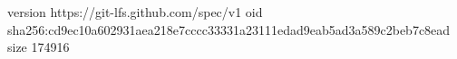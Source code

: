 version https://git-lfs.github.com/spec/v1
oid sha256:cd9ec10a602931aea218e7cccc33331a23111edad9eab5ad3a589c2beb7c8ead
size 174916
